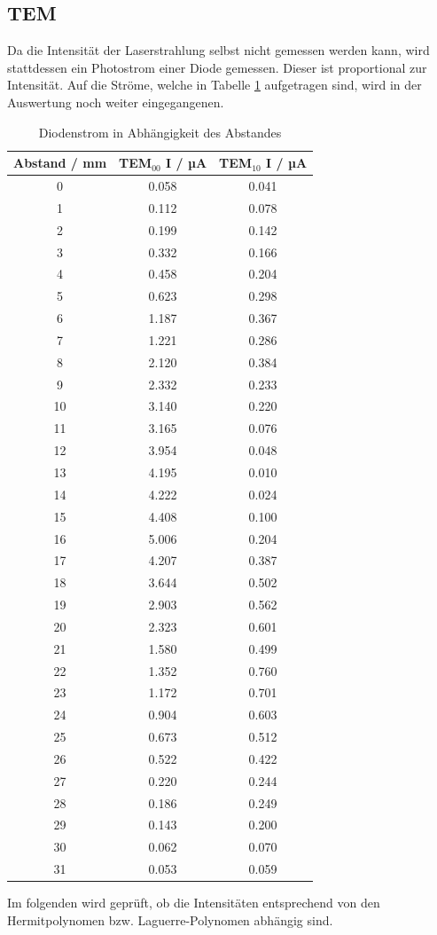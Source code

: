 \subsection{TEM}
Da die Intensität der Laserstrahlung selbst nicht gemessen werden kann, wird stattdessen ein Photostrom einer Diode gemessen. Dieser ist proportional zur Intensität. Auf die Ströme, welche in Tabelle \ref{tab:tem} aufgetragen sind, wird in der Auswertung noch weiter eingegangenen.
\begin{table}
  \centering
  \caption{Diodenstrom in Abhängigkeit des Abstandes}
  \begin{tabular}{c|c c}
     \toprule
     Abstand / mm & TEM$_{00}$ I / µA & TEM$_{10}$ I / µA \\
     \midrule
     0		& 0.058		& 0.041	\\
     1		& 0.112		& 0.078	\\
     2		& 0.199		& 0.142	\\
     3		& 0.332		& 0.166	\\
     4		& 0.458		& 0.204	\\
     5		& 0.623		& 0.298	\\
     6		& 1.187		& 0.367	\\
     7		& 1.221		& 0.286	\\
     8		& 2.120		& 0.384	\\
     9		& 2.332		& 0.233	\\
     10		& 3.140		& 0.220	\\
     11		& 3.165		& 0.076	\\
     12		& 3.954		& 0.048	\\
     13		& 4.195		& 0.010	\\
     14		& 4.222		& 0.024	\\
     15		& 4.408		& 0.100	\\
     16		& 5.006		& 0.204	\\
     17		& 4.207		& 0.387	\\
     18		& 3.644		& 0.502	\\
     19		& 2.903		& 0.562	\\
     20		& 2.323		& 0.601	\\
     21		& 1.580		& 0.499	\\
     22		& 1.352		& 0.760	\\
     23		& 1.172		& 0.701	\\
     24		& 0.904		& 0.603	\\
     25		& 0.673		& 0.512	\\
     26		& 0.522		& 0.422	\\
     27		& 0.220		& 0.244	\\
     28		& 0.186		& 0.249	\\
     29		& 0.143		& 0.200	\\
     30		& 0.062		& 0.070	\\
     31		& 0.053		& 0.059	\\
     \bottomrule
  \end{tabular}
  \label{tab:tem}
\end{table}
Im folgenden wird geprüft, ob die Intensitäten entsprechend von den Hermitpolynomen bzw. Laguerre-Polynomen abhängig sind.
